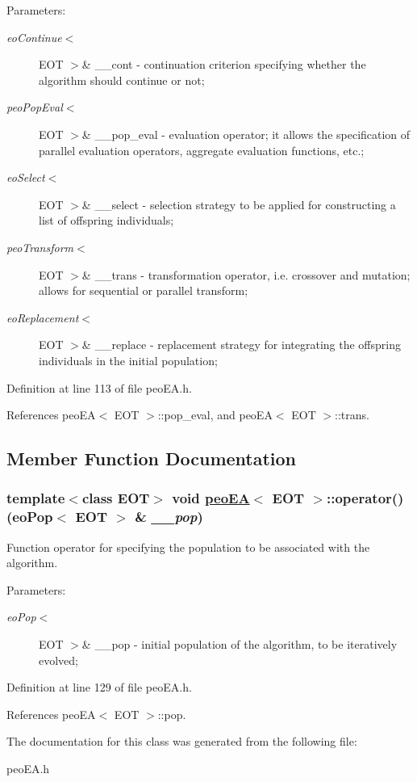 \begin{Desc}
\item[Parameters:]
\begin{description}
\item[{\em eo\-Continue$<$}]EOT $>$\& \_\-\_\-cont - continuation criterion specifying whether the algorithm should continue or not; \item[{\em peo\-Pop\-Eval$<$}]EOT $>$\& \_\-\_\-pop\_\-eval - evaluation operator; it allows the specification of parallel evaluation operators, aggregate evaluation functions, etc.; \item[{\em eo\-Select$<$}]EOT $>$\& \_\-\_\-select - selection strategy to be applied for constructing a list of offspring individuals; \item[{\em peo\-Transform$<$}]EOT $>$\& \_\-\_\-trans - transformation operator, i.e. crossover and mutation; allows for sequential or parallel transform; \item[{\em eo\-Replacement$<$}]EOT $>$\& \_\-\_\-replace - replacement strategy for integrating the offspring individuals in the initial population; \end{description}
\end{Desc}


Definition at line 113 of file peo\-EA.h.

References peo\-EA$<$ EOT $>$::pop\_\-eval, and peo\-EA$<$ EOT $>$::trans.

\subsection{Member Function Documentation}
\hypertarget{classpeoEA_3c709e3b2491147d26fee36138644613}{
\subsubsection[operator()]{\setlength{\rightskip}{0pt plus 5cm}template$<$class EOT$>$ void \hyperlink{classpeoEA}{peo\-EA}$<$ EOT $>$::operator() (eo\-Pop$<$ EOT $>$ \& {\em \_\-\_\-pop})}}
\label{classpeoEA_3c709e3b2491147d26fee36138644613}


Function operator for specifying the population to be associated with the algorithm. 

\begin{Desc}
\item[Parameters:]
\begin{description}
\item[{\em eo\-Pop$<$}]EOT $>$\& \_\-\_\-pop - initial population of the algorithm, to be iteratively evolved; \end{description}
\end{Desc}


Definition at line 129 of file peo\-EA.h.

References peo\-EA$<$ EOT $>$::pop.

The documentation for this class was generated from the following file:\begin{CompactItemize}
\item 
peo\-EA.h\end{CompactItemize}
